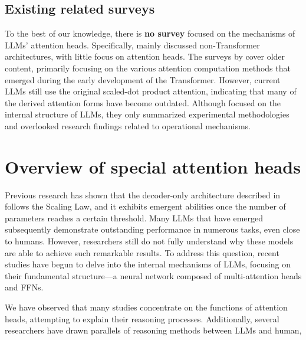 \documentclass[12pt,letterpaper]{article}
\begin{document}
\subsection*{Existing related surveys}
To the best of our knowledge, there is \textbf{no survey} focused on the mechanisms of LLMs' attention heads. Specifically, \citet{SurveyDNNInner_23_SaTML_MIT} mainly discussed non-Transformer architectures, with little focus on attention heads. The surveys by \citet{SurveyMdedical_22_IEEE_Portugal, SurveyNeurAttn_21_arXiv_Brazil, SurveyAttentionModel_21_Linkedin, SurveydDLAttn_22_arixv_Netherland} cover older content, primarily focusing on the various attention computation methods that emerged during the early development of the Transformer. However, current LLMs still use the original scaled-dot product attention, indicating that many of the derived attention forms have become outdated. Although \citet{SurveyLLMInterp_24_arXiv} focused on the internal structure of LLMs, they only summarized experimental methodologies and overlooked research findings related to operational mechanisms.



\section*{Overview of special attention heads} \label{sec:HeadOverview}
Previous research has shown that the decoder-only architecture described in  follows the Scaling Law, and it exhibits emergent abilities once the number of parameters reaches a certain threshold.\citep{ScalingLaw_20_arXiv_OpenAI, ScalingLaw_21_arXiv_Stanford} Many LLMs that have emerged subsequently demonstrate outstanding performance in numerous tasks, even close to humans. However, researchers still do not fully understand why these models are able to achieve such remarkable results. To address this question, recent studies have begun to delve into the internal mechanisms of LLMs, focusing on their fundamental structure—a neural network composed of multi-attention heads and FFNs.

We have observed that many studies concentrate on the functions of attention heads, attempting to explain their reasoning processes. Additionally, several researchers have drawn parallels of reasoning methods between LLMs and human, 
\end{document}
